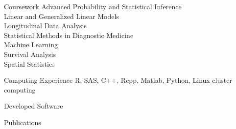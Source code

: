 \documentclass{resume} %
\begin{document}
\begin{rSection}{Coursework}
Advanced Probability and Statistical Inference\\
Linear and Generalized Linear Models\\
Longitudinal Data Analysis\\
Statistical Methods in Diagnostic Medicine\\
Machine Learning\\
Survival Analysis\\
Spatial Statistics
\end{rSection}


\begin{rSection}{Computing Experience}
R, SAS, C++, Rcpp, Matlab, Python, Linux cluster computing

\end{rSection}


\begin{rSection}{Developed Software}

\begin{refsection}
\nocite{*}
\leavevmode\printbibliography[omitnumbers=true,heading=none]
\end{refsection}

\end{rSection}

\begin{rSection}{Publications}

\begin{refsection}[CV.bib]
\nocite{*}
\printbibliography[keyword=Published,omitnumbers=true,title=Published]
\printbibliography[keyword=Accepted,omitnumbers=true,title=Accepted]
\printbibliography[keyword=Submitted,omitnumbers=true,title=Submitted]
\end{refsection}

\end{rSection}
\end{document}
